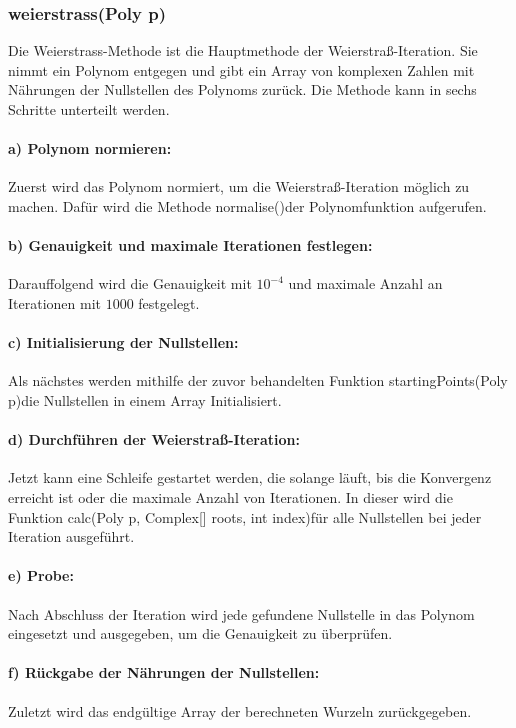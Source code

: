 \documentclass[12pt]{article}
\begin{document}
\subsubsection*{weierstrass(Poly p)}
Die \glqq Weierstrass\grqq-Methode ist die Hauptmethode der Weierstraß-Iteration. Sie nimmt ein Polynom entgegen und gibt ein Array von komplexen Zahlen mit Nährungen der Nullstellen des Polynoms zurück. Die Methode kann in sechs Schritte unterteilt werden.

\paragraph{a) Polynom normieren:}
Zuerst wird das Polynom normiert, um die Weierstraß-Iteration möglich zu machen. Dafür wird die Methode \glqq normalise()\grqq\space der Polynomfunktion aufgerufen.

\paragraph{b) Genauigkeit und maximale Iterationen festlegen:}
Darauffolgend wird die Genauigkeit mit $10^{-4}$ und maximale Anzahl an Iterationen mit $1000$ festgelegt.

\paragraph{c) Initialisierung der Nullstellen:}
Als nächstes werden mithilfe der zuvor behandelten Funktion \glqq startingPoints(Poly p)\grqq\space die Nullstellen in einem Array Initialisiert.

\paragraph{d) Durchführen der Weierstraß-Iteration:}
Jetzt kann eine Schleife gestartet werden, die solange läuft, bis die Konvergenz erreicht ist oder die maximale Anzahl von Iterationen. In dieser wird die Funktion \glqq calc(Poly p, Complex[] roots, int index)\grqq\space für alle Nullstellen bei jeder Iteration ausgeführt.

\paragraph{e) Probe:}
Nach Abschluss der Iteration wird jede gefundene Nullstelle in das Polynom eingesetzt und ausgegeben, um die Genauigkeit zu überprüfen.

\paragraph{f) Rückgabe der Nährungen der Nullstellen:}
Zuletzt wird das endgültige Array der berechneten Wurzeln zurückgegeben.
\end{document}
